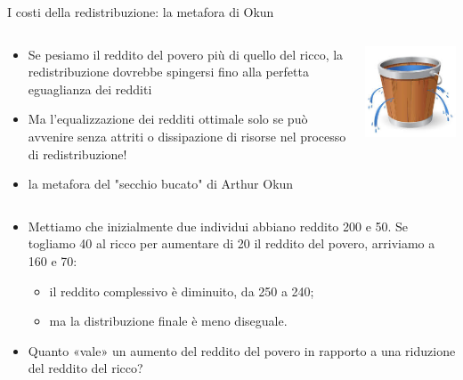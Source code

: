 \documentclass[11pt]{beamer}
\begin{document}
\begin{frame}{I costi della redistribuzione: la metafora di Okun}
\begin{columns}
\begin{column}{.75\columnwidth}
\begin{itemize}
\item Se pesiamo il reddito del povero più di quello del ricco, la
redistribuzione dovrebbe spingersi fino alla perfetta eguaglianza dei redditi
\item Ma l'equalizzazione dei redditi ottimale solo se può avvenire senza attriti
o dissipazione di risorse nel processo di redistribuzione!
\item la metafora del "secchio bucato" di Arthur Okun
\end{itemize}
\end{column}
\begin{column}{.25\columnwidth}
\begin{center}
\includegraphics[width=.9\linewidth]{./figure/leaky-bucket.jpeg}
\end{center}
\end{column}
\end{columns}
\vspace{6mm} 
\begin{itemize}
\item Mettiamo che inizialmente due individui abbiano reddito 200 e 50.  Se
togliamo 40 al ricco per aumentare di 20 il reddito del povero, arriviamo a
160 e 70:
\begin{itemize}
\item il reddito complessivo è diminuito, da 250 a 240;
\item ma la distribuzione finale è meno diseguale.
\end{itemize}
\item Quanto «vale» un aumento del reddito del povero in rapporto a una riduzione
del reddito del ricco?
\end{itemize}
\end{frame}
\end{document}

